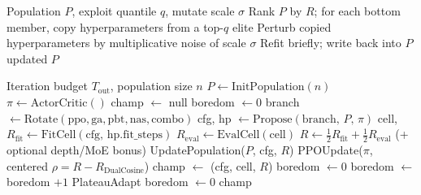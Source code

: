 \begin{algorithm}[t]
\caption{PBT exploit--mutate}
\label{alg:pbt}
\begin{algorithmic}[1]
\Require Population $P$, exploit quantile $q$, mutate scale $\sigma$
\State Rank $P$ by $R$; for each bottom member, copy hyperparameters from a top-$q$ elite
\State Perturb copied hyperparameters by multiplicative noise of scale $\sigma$
\State Refit briefly; write back into $P$
\State \Return updated $P$
\end{algorithmic}
\end{algorithm}

\begin{algorithm}[t]
\caption{HybridMetaSearch}
\label{alg:hybrid}
\begin{algorithmic}[1]
\Require Iteration budget $T_{\mathrm{out}}$, population size $n$
\State $P \gets \mathrm{InitPopulation}(n)$
\State $\pi \gets \mathrm{ActorCritic}()$
\State champ $\gets$ null
\State boredom $\gets 0$
    \State branch $\gets \mathrm{Rotate}(\mathrm{ppo},\mathrm{ga},\mathrm{pbt},\mathrm{nas},\mathrm{combo})$
    \State cfg, hp $\gets \mathrm{Propose}(\mathrm{branch},\,P,\,\pi)$
    \State cell, $R_{\mathrm{fit}} \gets \mathrm{FitCell}(\mathrm{cfg},\,\mathrm{hp.fit\_steps})$
    \State $R_{\mathrm{eval}} \gets \mathrm{EvalCell}(\mathrm{cell})$
    \State $R \gets \tfrac12 R_{\mathrm{fit}} + \tfrac12 R_{\mathrm{eval}}$ (+ optional depth/MoE bonus)
    \State UpdatePopulation($P$, cfg, $R$)
    \State PPOUpdate($\pi$, centered $\rho = R - R_{\mathrm{DualCosine}}$)
      \State champ $\gets$ (cfg, cell, $R$)
      \State boredom $\gets 0$
    \Else
      \State boredom $\gets$ boredom $+1$
    \EndIf
      \State PlateauAdapt
      \State boredom $\gets 0$
    \EndIf
\EndFor
\State \Return champ
\end{algorithmic}
\end{algorithm}
